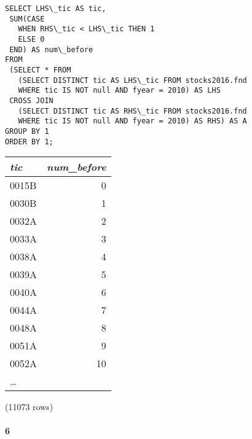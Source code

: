 \documentclass[]{article}
\let\oldparagraph\paragraph
\renewcommand{\paragraph}[1]{\oldparagraph{#1}\mbox{}}
\begin{document}
\color{blue}
\begin{verbatim}
SELECT LHS\_tic AS tic,
 SUM(CASE
   WHEN RHS\_tic < LHS\_tic THEN 1
   ELSE 0
 END) AS num\_before
FROM
 (SELECT * FROM
   (SELECT DISTINCT tic AS LHS\_tic FROM stocks2016.fnd
   WHERE tic IS NOT null AND fyear = 2010) AS LHS
 CROSS JOIN
   (SELECT DISTINCT tic AS RHS\_tic FROM stocks2016.fnd
   WHERE tic IS NOT null AND fyear = 2010) AS RHS) AS A
GROUP BY 1
ORDER BY 1;
\end{verbatim}
\color{black}

\begin{center}
\begin{tabular}{l | r}
\textit{tic} & \textit{num\_before} \\
\hline
0015B & 0 \\
0030B & 1 \\
0032A & 2 \\
0033A & 3 \\
0038A & 4 \\
0039A & 5 \\
0040A & 6 \\
0044A & 7 \\
0048A & 8 \\
0051A & 9 \\
0052A & 10 \\
\ldots\\
\end{tabular}

\noindent (11073 rows) \\
\end{center}

\paragraph{6}
\end{document}
